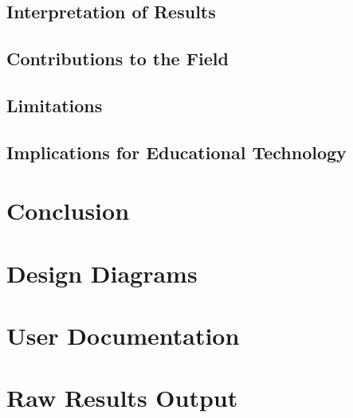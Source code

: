 \documentclass[12pt,a4paper]{report}
\begin{document}
\section{Interpretation of Results}
\section{Contributions to the Field}
\section{Limitations}
\section{Implications for Educational Technology}

\chapter{Conclusion}





\appendix


\chapter{Design Diagrams}

\chapter{User Documentation}

\chapter{Raw Results Output}
\end{document}
